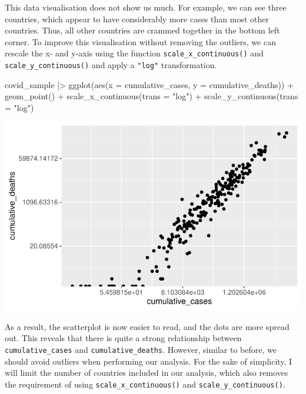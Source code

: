 \documentclass[
  letterpaper,
]{krantz}
\makeatletter
\newenvironment{Shaded}{\begin{snugshade}}{\end{snugshade}}
\newcommand{\AttributeTok}[1]{\textcolor[rgb]{0.40,0.45,0.13}{#1}}
\newcommand{\FunctionTok}[1]{\textcolor[rgb]{0.28,0.35,0.67}{#1}}
\newcommand{\NormalTok}[1]{\textcolor[rgb]{0.00,0.23,0.31}{#1}}
\newcommand{\SpecialCharTok}[1]{\textcolor[rgb]{0.37,0.37,0.37}{#1}}
\newcommand{\StringTok}[1]{\textcolor[rgb]{0.13,0.47,0.30}{#1}}
\newenvironment{kframe}{%
\medskip{}
\setlength{\fboxsep}{.8em}
 \def\at@end@of@kframe{}%
 \ifinner\ifhmode%
  \def\at@end@of@kframe{\end{minipage}}%
  \begin{minipage}{\columnwidth}%
 \fi\fi%
 \def\FrameCommand##1{\hskip\@totalleftmargin \hskip-\fboxsep
 \colorbox{shadecolor}{##1}\hskip-\fboxsep
     \hskip-\linewidth \hskip-\@totalleftmargin \hskip\columnwidth}%
 \MakeFramed {\advance\hsize-\width
   \@totalleftmargin\z@ \linewidth\hsize
   \@setminipage}}%
 {\par\unskip\endMakeFramed%
 \at@end@of@kframe}
\renewenvironment{Shaded}{\begin{kframe}}{\end{kframe}}
\makeatother
\begin{document}
This data visualisation does not show us much. For example, we can see
three countries, which appear to have considerably more cases than most
other countries. Thus, all other countries are crammed together in the
bottom left corner. To improve this visualisation without removing the
outliers, we can rescale the x- and y-axis using the function
\texttt{scale\_x\_continuous()} and \texttt{scale\_y\_continuous()} and
apply a \texttt{"log"} transformation.

\begin{Shaded}
\begin{Highlighting}[]
\NormalTok{covid\_sample }\SpecialCharTok{|\textgreater{}}
  \FunctionTok{ggplot}\NormalTok{(}\FunctionTok{aes}\NormalTok{(}\AttributeTok{x =}\NormalTok{ cumulative\_cases,}
             \AttributeTok{y =}\NormalTok{ cumulative\_deaths)) }\SpecialCharTok{+}
  \FunctionTok{geom\_point}\NormalTok{() }\SpecialCharTok{+}
  \FunctionTok{scale\_x\_continuous}\NormalTok{(}\AttributeTok{trans =} \StringTok{"log"}\NormalTok{) }\SpecialCharTok{+}
  \FunctionTok{scale\_y\_continuous}\NormalTok{(}\AttributeTok{trans =} \StringTok{"log"}\NormalTok{)}
\end{Highlighting}
\end{Shaded}

\includegraphics{13_regressions_files/figure-pdf/fitting-model-by-hand-step-two-1.pdf}

As a result, the scatterplot is now easier to read, and the dots are
more spread out. This reveals that there is quite a strong relationship
between \texttt{cumulative\_cases} and \texttt{cumulative\_deaths}.
However, similar to before, we should avoid outliers when performing our
analysis. For the sake of simplicity, I will limit the number of
countries included in our analysis, which also removes the requirement
of using \texttt{scale\_x\_continuous()} and
\texttt{scale\_y\_continuous()}.
\end{document}
